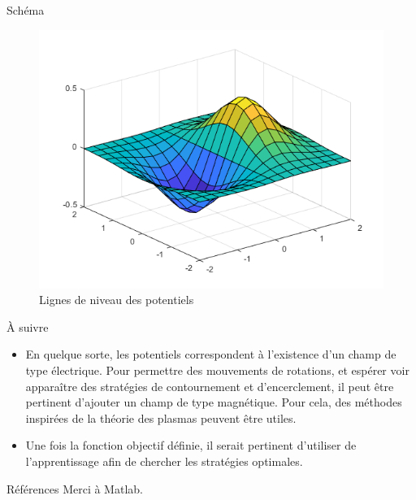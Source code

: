\documentclass[final,hyperref={pdfpagelabels=false}]{beamer}
\begin{document}
\begin{frame}[t]
\begin{columns}[t]
\begin{column}{.465\textwidth}
\begin{block}{Sch\'ema}
\begin{figure}
\includegraphics[width=0.8\linewidth]{potentials.png}
\caption{\text{ } Lignes de niveau des potentiels}
\end{figure}

\end{block}


\begin{block}{\`A suivre}

\begin{itemize}
\item En quelque sorte, les potentiels correspondent \`a l'existence d'un champ de type \'electrique. Pour permettre des mouvements de rotations, et esp\'erer voir appara\^itre des strat\'egies de contournement et d'encerclement, il peut \^etre pertinent d'ajouter un champ de type magn\'etique. Pour cela, des m\'ethodes inspir\'ees de la th\'eorie des plasmas peuvent \^etre utiles.
\item Une fois la fonction objectif d\'efinie, il serait pertinent d'utiliser de l'apprentissage afin de chercher les strat\'egies optimales.
\end{itemize}

\end{block}


\begin{block}{R\'ef\'erences}
Merci \`a Matlab.


\end{block}
\end{column}
\end{columns}
\end{frame}
\end{document}
